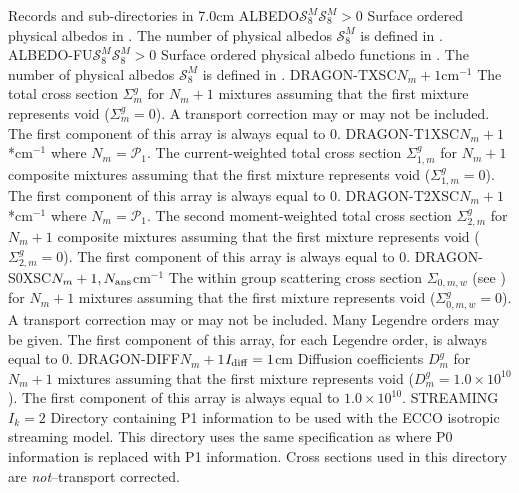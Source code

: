 \begin{DescriptionEnregistrement}{Records and sub-directories in }{7.0cm}
\OptRealEnr
  {ALBEDO}{$\mathcal{S}^{M}_{8}$}{$\mathcal{S}^{M}_{8}>0$}{}
  {Surface ordered physical albedos in . The number of physical albedos $\mathcal{S}^{M}_{8}$ is defined
  in .}
\OptRealEnr
  {ALBEDO-FU}{$\mathcal{S}^{M}_{8}$}{$\mathcal{S}^{M}_{8}>0$}{}
  {Surface ordered physical albedo functions in . The number of physical albedos $\mathcal{S}^{M}_{8}$ is defined
  in .}
\RealEnr
  {DRAGON-TXSC}{$N_{m}+1$}{cm$^{-1}$}
  {The total cross section $\Sigma_{m}^{g}$ for $N_{m}+1$ mixtures assuming that the first mixture
   represents void ($\Sigma_{m}^{g}=0$). A transport correction may or may not
   be included. The first component of this array is always equal to 0.}
\OptRealEnr
  {DRAGON-T1XSC}{$N_{m}+1$}{*}{cm$^{-1}$}
  {where $N_{m}=\mathcal{P}_{1}$. The current-weighted total cross section $\Sigma_{1,m}^{g}$ for $N_{m}+1$ composite mixtures assuming that the first mixture
   represents void ($\Sigma_{1,m}^{g}=0$). The first component of this array is always equal to 0.}
\OptRealEnr
  {DRAGON-T2XSC}{$N_{m}+1$}{*}{cm$^{-1}$}
  {where $N_{m}=\mathcal{P}_{1}$. The second moment-weighted total cross section $\Sigma_{2,m}^{g}$ for $N_{m}+1$ composite mixtures assuming that the first mixture
   represents void ($\Sigma_{2,m}^{g}=0$). The first component of this array is always equal to 0.}
\RealEnr
  {DRAGON-S0XSC}{$N_{m}+1,N_{\rm ans}$}{cm$^{-1}$}
  {The within group scattering cross section $\Sigma_{0,m,w}$ (see )
   for $N_{m}+1$ mixtures assuming that the first mixture
   represents void ($\Sigma_{0,m,w}^{g}=0$). A transport correction may or may not
   be included. Many Legendre orders may be given. The first component of this
   array, for each Legendre order, is always equal to 0.}
\OptRealEnr
  {DRAGON-DIFF}{$N_{m}+1$}{$I_{\rm diff}=1$}{cm}
  {Diffusion coefficients $D_{m}^{g}$ for $N_{m}+1$ mixtures assuming that the first mixture
   represents void ($D_{m}^{g}=1.0\times 10^{10}$). The first component of this array is always equal to $1.0\times 10^{10}$.}
\OptDirEnr
  {STREAMING}{$I_{k}=2$}
  {Directory containing P1 information to be used with the ECCO isotropic
  streaming model. This directory uses the same specification as 
  where P0 information is replaced with P1 information. Cross sections
  used in this directory are {\sl not}--transport corrected.} 
\end{DescriptionEnregistrement}

